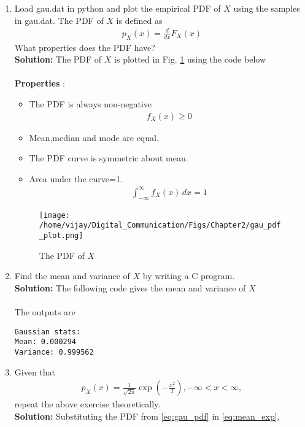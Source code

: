 \documentclass[journal,10pt,twocolumn]{IEEEtran}
\newcounter{Chapcounter}
\numberwithin{equation}{subsection}
\numberwithin{figure}{subsection}
\renewcommand\thesection{\theChapcounter.\arabic{section}}
\providecommand{\brak}[1]{\ensuremath{\left(#1\right)}}
\newcommand{\solution}{\noindent \textbf{Solution: }}
\renewcommand\thesection{\arabic{section}}
\renewcommand\thesubsection{\thesection.\arabic{subsection}}
\begin{document}
\begin{enumerate}[label=\thesubsection.\arabic*,ref=\thesubsection.\arabic{figure}]
\item
Load gau.dat in python and plot the empirical PDF of $X$ using the samples in gau.dat. The PDF of $X$ is defined as
\begin{align}
p_{X}(x) = \frac{d}{dx}F_{X}(x)
\label{eq:cdf_to_pdf}
\end{align}
What properties does the PDF have?
\\
\solution The PDF of $X$ is plotted in Fig. \ref{fig:gauss_pdf} using the code below\\

\\

\textbf{Properties} : 
\begin{itemize}
\item The PDF is always non-negative
\begin{align}
f_X(x) \ge 0
\end{align}
\item Mean,median and mode are equal.
\item The PDF curve is symmetric about mean.
\item Area under the curve=1.
\begin{align}
	\int_{-\infty}^{\infty} f_X(x) \,dx = 1
\end{align}
\end{itemize}

\begin{figure}[!ht]
\centering
\texttt{[image: /home/vijay/Digital\_Communication/Figs/Chapter2/gau\_pdf\_plot.png]}  
\caption{The PDF of $X$}
\label{fig:gauss_pdf}
\end{figure}

\item Find the mean and variance of $X$ by writing a C program.\\

\solution The following code gives the mean and variance of $X$\\

\\

The outputs are
\begin{lstlisting}
Gaussian stats:
Mean: 0.000294
Variance: 0.999562	
\end{lstlisting}

\item Given that 
\begin{align}
p_{X}(x) = \frac{1}{\sqrt{2\pi}}\exp\brak{-\frac{x^2}{2}}, -\infty < x < \infty,
\label{eq:gau_pdf}
\end{align}
repeat the above exercise theoretically.\\
\solution Substituting the PDF from \eqref{eq:gau_pdf} in \eqref{eq:mean_exp},


\end{enumerate}
\end{document}
